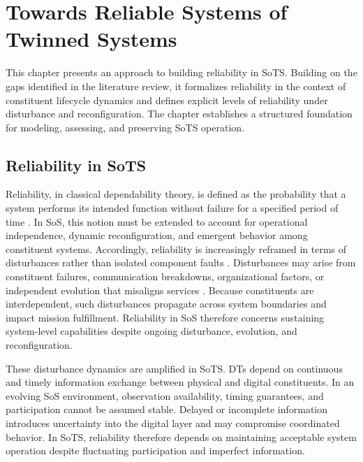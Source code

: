 \chapter{Towards Reliable Systems of Twinned Systems}\label{ch:approach}
This chapter presents an approach to building reliability in SoTS. Building on the gaps identified in the literature review, it formalizes reliability in the context of constituent lifecycle dynamics and defines explicit levels of reliability under disturbance and reconfiguration. The chapter establishes a structured foundation for modeling, assessing, and preserving SoTS operation.

\section{Reliability in SoTS}
Reliability, in classical dependability theory, is defined as the probability that a system performs its intended function without failure for a specified period of time \cite{avizienis2004basic}. In SoS, this notion must be extended to account for operational independence, dynamic reconfiguration, and emergent behavior among constituent systems. Accordingly, reliability is increasingly reframed in terms of disturbances rather than isolated component faults \cite{ferreira2023towards}. 
Disturbances may arise from constituent failures, communication breakdowns, organizational factors, or independent evolution that misaligns services \cite{ferreira2021reliability}.
Because constituents are interdependent, such disturbances propagate across system boundaries and impact mission fulfillment. Reliability in SoS therefore concerns sustaining system-level capabilities despite ongoing disturbance, evolution, and reconfiguration.



These disturbance dynamics are amplified in SoTS. DTs depend on continuous and timely information exchange between physical and digital constituents. In an evolving SoS environment, observation availability, timing guarantees, and participation cannot be assumed stable. Delayed or incomplete information introduces uncertainty into the digital layer and may compromise coordinated behavior. In SoTS, reliability therefore depends on maintaining acceptable system operation despite fluctuating participation and imperfect information.

